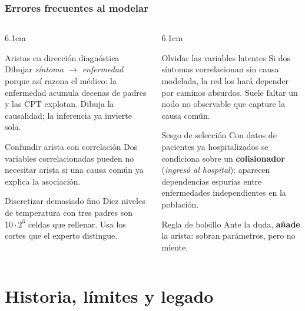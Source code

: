 \documentclass[aspectratio=169, 10pt]{beamer}
\begin{document}
\begin{frame}
\frametitle{Errores frecuentes al modelar}
\begin{columns}[T]
\begin{column}{6.1cm}
\begin{alertblock}{Aristas en dirección diagnóstica}
\footnotesize
Dibujar \emph{síntoma $\to$ enfermedad} porque así razona el médico: la enfermedad acumula decenas de padres y las CPT explotan. Dibuja la causalidad; la inferencia ya invierte sola.
\end{alertblock}
\begin{alertblock}{Confundir arista con correlación}
\footnotesize
Dos variables correlacionadas pueden no necesitar arista si una causa común ya explica la asociación.
\end{alertblock}
\begin{alertblock}{Discretizar demasiado fino}
\footnotesize
Diez niveles de temperatura con tres padres son $10\cdot 2^3$ celdas que rellenar. Usa los cortes que el experto distingue.
\end{alertblock}
\end{column}
\begin{column}{6.1cm}
\begin{alertblock}{Olvidar las variables latentes}
\footnotesize
Si dos síntomas correlacionan sin causa modelada, la red los hará depender por caminos absurdos. Suele faltar un nodo no observable que capture la causa común.
\end{alertblock}
\begin{alertblock}{Sesgo de selección}
\footnotesize
Con datos de pacientes ya hospitalizados se condiciona sobre un \textbf{colisionador} (\emph{ingresó al hospital}): aparecen dependencias espurias entre enfermedades independientes en la población.
\end{alertblock}
\begin{block}{Regla de bolsillo}
\footnotesize
Ante la duda, \textbf{añade} la arista: sobran parámetros, pero no miente.
\end{block}
\end{column}
\end{columns}
\end{frame}

\section{Historia, límites y legado}
\end{document}
